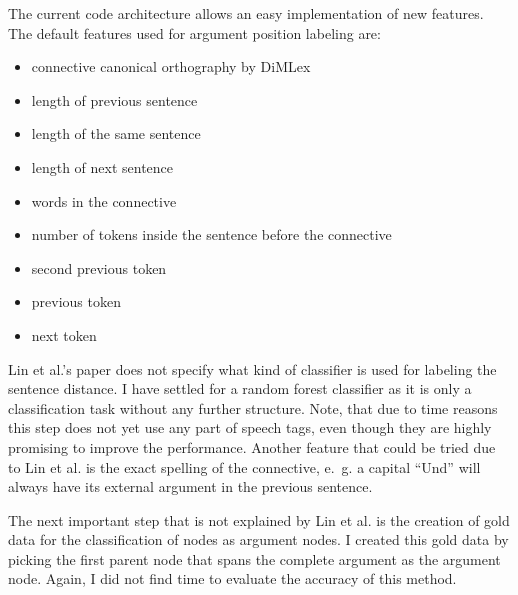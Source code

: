 \documentclass[10pt,a4paper]{article}
\begin{document}
The current code architecture allows an easy implementation of new features. The default features used for argument position labeling are:
\begin{itemize}
\item connective canonical orthography by DiMLex
\item length of previous sentence
\item length of the same sentence
\item length of next sentence
\item words in the connective
\item number of tokens inside the sentence before the connective
\item second previous token
\item previous token
\item next token
\end{itemize}
Lin et al.'s paper does not specify what kind of classifier is used for labeling the sentence distance. I have settled for a random forest classifier as it is only a classification task without any further structure.
Note, that due to time reasons this step does not yet use any part of speech tags, even though they are highly promising to improve the performance. Another feature that could be tried due to Lin et al. is the exact spelling of the connective, e.~g. a capital ``Und'' will always have its external argument in the previous sentence.

The next important step that is not explained by Lin et al. is the creation of gold data for the classification of nodes as argument nodes. I created this gold data by picking the first parent node that spans the complete argument as the argument node. Again, I did not find time to evaluate the accuracy of this method.
\end{document}
